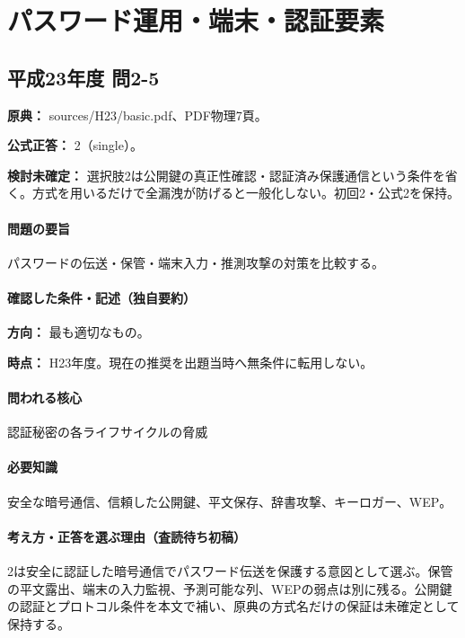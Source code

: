 \section{パスワード運用・端末・認証要素}

\subsection{平成23年度 問2-5}
\label{q:h23-reg-basic-2-5}

\noindent\textbf{原典：} sources/H23/basic.pdf、PDF物理7頁。

\textbf{公式正答：} 2（single）。

\par\textbf{検討未確定：} 選択肢2は公開鍵の真正性確認・認証済み保護通信という条件を省く。方式を用いるだけで全漏洩が防げると一般化しない。初回2・公式2を保持。

\paragraph{問題の要旨} パスワードの伝送・保管・端末入力・推測攻撃の対策を比較する。

\paragraph{確認した条件・記述（独自要約）}\mbox{}\par

\noindent\textbf{方向：} 最も適切なもの。\par

\noindent\textbf{時点：} H23年度。現在の推奨を出題当時へ無条件に転用しない。\par

\paragraph{問われる核心} 認証秘密の各ライフサイクルの脅威

\paragraph{必要知識} 安全な暗号通信、信頼した公開鍵、平文保存、辞書攻撃、キーロガー、WEP。

\paragraph{考え方・正答を選ぶ理由（査読待ち初稿）} 2は安全に認証した暗号通信でパスワード伝送を保護する意図として選ぶ。保管の平文露出、端末の入力監視、予測可能な列、WEPの弱点は別に残る。公開鍵の認証とプロトコル条件を本文で補い、原典の方式名だけの保証は未確定として保持する。

